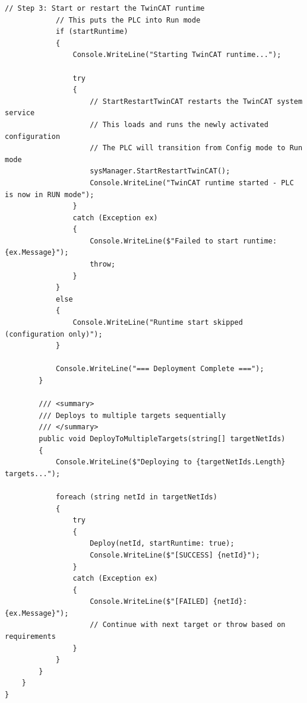 \documentclass[11pt,a4paper]{article}
\begin{document}
\begin{lstlisting}[style=csharpstyle]
            // Step 3: Start or restart the TwinCAT runtime
            // This puts the PLC into Run mode
            if (startRuntime)
            {
                Console.WriteLine("Starting TwinCAT runtime...");
                
                try
                {
                    // StartRestartTwinCAT restarts the TwinCAT system service
                    // This loads and runs the newly activated configuration
                    // The PLC will transition from Config mode to Run mode
                    sysManager.StartRestartTwinCAT();
                    Console.WriteLine("TwinCAT runtime started - PLC is now in RUN mode");
                }
                catch (Exception ex)
                {
                    Console.WriteLine($"Failed to start runtime: {ex.Message}");
                    throw;
                }
            }
            else
            {
                Console.WriteLine("Runtime start skipped (configuration only)");
            }
            
            Console.WriteLine("=== Deployment Complete ===");
        }
        
        /// <summary>
        /// Deploys to multiple targets sequentially
        /// </summary>
        public void DeployToMultipleTargets(string[] targetNetIds)
        {
            Console.WriteLine($"Deploying to {targetNetIds.Length} targets...");
            
            foreach (string netId in targetNetIds)
            {
                try
                {
                    Deploy(netId, startRuntime: true);
                    Console.WriteLine($"[SUCCESS] {netId}");
                }
                catch (Exception ex)
                {
                    Console.WriteLine($"[FAILED] {netId}: {ex.Message}");
                    // Continue with next target or throw based on requirements
                }
            }
        }
    }
}
\end{lstlisting}
\end{document}
